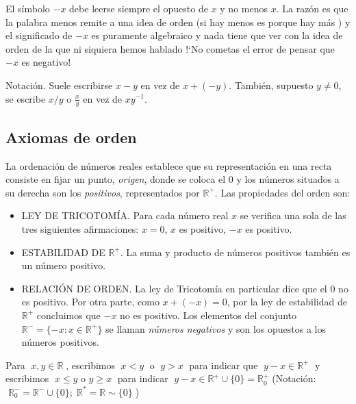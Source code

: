 		El símbolo $-x$ debe leerse siempre el opuesto de $x$ y no menos $x$. La razón es que la palabra menos  remite a una idea de orden (si hay menos  es porque hay más ) y el significado de $-x$ es puramente algebraico y nada tiene que ver con la idea de orden de la que ni siquiera hemos hablado  !`No cometas el error de pensar que $-x$ es negativo!

		Notación. Suele escribirse $x - y$ en vez de $x + (-y)$. También, supuesto $y \neq 0$, se escribe $x/y$ o $\frac x y$ en vez de $xy^{-1}$.
	
		
	
	\subsection{Axiomas de orden}
		
		\begin{axio}
			La ordenación de números reales establece que su representación en una recta consiste en fijar un punto, \textit{origen}, donde se coloca el $0$ y los números situados a su derecha son los \textit{positivos}, representados por $\mathbb R^+$. Las propiedades del orden son:
		\end{axio}
		
		\begin{itemize}
		\item LEY DE TRICOTOMÍA. Para cada número real $x$ se verifica una sola de las tres siguientes afirmaciones:  $x=0$, $x$ es positivo, $-x$ es positivo.
		\item ESTABILIDAD DE $\mathbb R^+$. La suma y producto de números positivos también es un número positivo.
		\item RELACIÓN DE ORDEN. La ley de Tricotomía en particular dice que el $0$ no es positivo. Por otra parte, como $x+(-x)=0$, por la ley de estabilidad de $\mathbb R^+$ concluimos que $-x$ no es positivo. Los elementos del conjunto $\mathbb R^- = \{ -x: x\in \mathbb R^+ \} $ se llaman \textit{números negativos} y son los opuestos a los números positivos.
		\end{itemize}
	
		
		
		\begin{defi} Para $\;x,y  \in \mathbb R\;$, escribimos $\;x<y\;$ o $\; y>x\; $ para indicar que $\; y-x \in \mathbb R^+\; $ y escribimos $\; x\le y$ o $y \ge x\; $ para indicar $\; y-x \in \mathbb R^+ \cup \{ 0 \} = \mathbb R^+_0\; $(Notación: $\; \mathbb R^-_0=\mathbb R^-\cup \{ 0 \};\; \mathbb R^*=\mathbb R \sim \{ 0 \}\; $)
		\end{defi}
		
